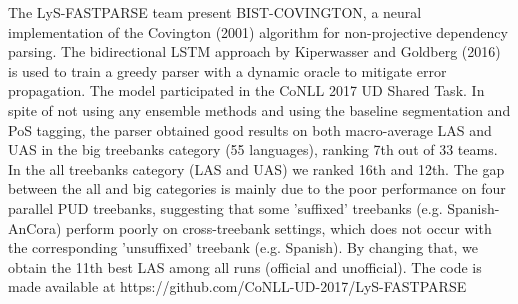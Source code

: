 The LyS-FASTPARSE team present BIST-COVINGTON, a neural implementation of the Covington (2001) algorithm for non-projective dependency parsing. The bidirectional LSTM approach by Kiperwasser and Goldberg (2016) is used to train a greedy parser with a dynamic oracle to mitigate error propagation. The model participated in the CoNLL 2017 UD Shared Task. In spite of not using any ensemble methods and using the baseline segmentation and PoS tagging, the parser obtained good results on both macro-average LAS and UAS in the big treebanks category (55 languages), ranking 7th out of 33 teams. In the all treebanks category (LAS and UAS) we ranked 16th and 12th. The gap between the all and big categories is mainly due to the poor performance on four parallel PUD treebanks, suggesting that some 'suffixed' treebanks (e.g. Spanish-AnCora) perform poorly on cross-treebank settings, which does not occur with the corresponding 'unsuffixed' treebank  (e.g. Spanish). By changing that, we obtain the 11th best LAS among all runs (official and unofficial). The code is made available at https://github.com/CoNLL-UD-2017/LyS-FASTPARSE
